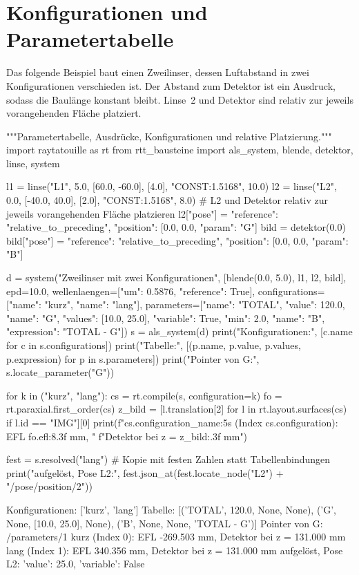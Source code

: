 \documentclass[11pt,a4paper,openany]{book}
\DeclareRobustCommand{\code}[1]{\texttt{\directlua{rttcode("\luaescapestring{\detokenize{#1}}")}}}
\begin{document}
\section{Konfigurationen und Parametertabelle}
\label{sec:konfig}

Das folgende Beispiel baut einen Zweilinser, dessen Luftabstand \code{G} in zwei
Konfigurationen verschieden ist. Der Abstand zum Detektor \code{B} ist ein Ausdruck, sodass die
Baulänge \code{TOTAL} konstant bleibt. Linse~2 und Detektor sind relativ zur jeweils
vorangehenden Fläche platziert.

\begin{pycode}[title={\code{ex14_konfigurationen.py}}]
"""Parametertabelle, Ausdrücke, Konfigurationen und relative Platzierung."""
import raytatouille as rt
from rtt_bausteine import als_system, blende, detektor, linse, system

l1 = linse("L1", 5.0, [60.0, -60.0], [4.0], "CONST:1.5168", 10.0)
l2 = linse("L2", 0.0, [-40.0, 40.0], [2.0], "CONST:1.5168", 8.0)
# L2 und Detektor relativ zur jeweils vorangehenden Fläche platzieren
l2["pose"] = {"reference": "relative_to_preceding", "position": [0.0, 0.0, {"param": "G"}]}
bild = detektor(0.0)
bild["pose"] = {"reference": "relative_to_preceding", "position": [0.0, 0.0, {"param": "B"}]}

d = system("Zweilinser mit zwei Konfigurationen", [blende(0.0, 5.0), l1, l2, bild], epd=10.0,
           wellenlaengen=[{"um": 0.5876, "reference": True}],
           configurations=[{"name": "kurz"}, {"name": "lang"}],
           parameters=[{"name": "TOTAL", "value": 120.0},
                       {"name": "G", "values": [10.0, 25.0], "variable": True, "min": 2.0},
                       {"name": "B", "expression": "TOTAL - G"}])
s = als_system(d)
print("Konfigurationen:", [c.name for c in s.configurations])
print("Tabelle:", [(p.name, p.value, p.values, p.expression) for p in s.parameters])
print("Pointer von G:", s.locate_parameter("G"))

for k in ("kurz", "lang"):
    cs = rt.compile(s, configuration=k)
    fo = rt.paraxial.first_order(cs)
    z_bild = [l.translation[2] for l in rt.layout.surfaces(cs) if l.id == "IMG"][0]
    print(f"{cs.configuration_name:5s} (Index {cs.configuration}): EFL {fo.efl:8.3f} mm, "
          f"Detektor bei z = {z_bild:.3f} mm")

fest = s.resolved("lang")              # Kopie mit festen Zahlen statt Tabellenbindungen
print("aufgelöst, Pose L2:", fest.json_at(fest.locate_node("L2") + "/pose/position/2"))
\end{pycode}
\begin{ausgabe}
Konfigurationen: ['kurz', 'lang']
Tabelle: [('TOTAL', 120.0, None, None), ('G', None, [10.0, 25.0], None), ('B', None, None, 'TOTAL - G')]
Pointer von G: /parameters/1
kurz  (Index 0): EFL -269.503 mm, Detektor bei z = 131.000 mm
lang  (Index 1): EFL  340.356 mm, Detektor bei z = 131.000 mm
aufgelöst, Pose L2: {'value': 25.0, 'variable': False}
\end{ausgabe}
\end{document}
